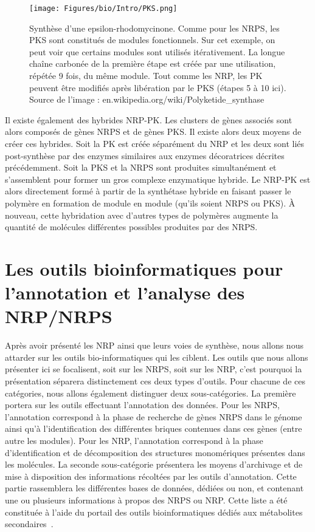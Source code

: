 \begin{figure}
  \begin{center}
    \texttt{[image: Figures/bio/Intro/PKS.png]}
    \caption{\label{pks}Synthèse d'une epsilon-rhodomycinone.
    Comme pour les NRPS, les PKS sont constitués de modules fonctionnels.
    Sur cet exemple, on peut voir que certains modules sont utilisés itérativement.
    La longue chaîne carbonée de la première étape est créée par une utilisation, répétée 9 fois, du même module.
    Tout comme les NRP, les PK peuvent être modifiés après libération par le PKS (étapes 5 à 10 ici).
    Source de l'image : en.wikipedia.org/wiki/Polyketide\_synthase}
  \end{center}
\end{figure}

Il existe également des hybrides NRP-PK.
Les clusters de gènes associés sont alors composés de gènes NRPS et de gènes PKS.
Il existe alors deux moyens de créer ces hybrides.
Soit la PK est créée séparément du NRP et les deux sont liés post-synthèse par des enzymes similaires aux enzymes décoratrices décrites précédemment.
Soit la PKS et la NRPS sont produites simultanément et s'assemblent pour former un gros complexe enzymatique hybride.
Le NRP-PK est alors directement formé à partir de la synthétase hybride en faisant passer le polymère en formation de module en module (qu'ils soient NRPS ou PKS).
À nouveau, cette hybridation avec d'autres types de polymères augmente la quantité de molécules différentes possibles produites par des NRPS.









\section{Les outils bioinformatiques pour l'annotation et l'analyse des NRP/NRPS}
\label{bioanalyse}

Après avoir présenté les NRP ainsi que leurs voies de synthèse, nous allons nous attarder sur les outils bio-informatiques qui les ciblent.
Les outils que nous allons présenter ici se focalisent, soit sur les NRPS, soit sur les NRP, c'est pourquoi la présentation séparera distinctement ces deux types d'outils.
Pour chacune de ces catégories, nous allons également distinguer deux sous-catégories.
La première portera sur les outils effectuant l'annotation des données.
Pour les NRPS, l'annotation correspond à la phase de recherche de gènes NRPS dans le génome ainsi qu'à l'identification des différentes briques contenues dans ces gènes (entre autre les modules).
Pour les NRP, l'annotation correspond à la phase d'identification et de décomposition des structures monomériques présentes dans les molécules.
La seconde sous-catégorie présentera les moyens d'archivage et de mise à disposition des informations récoltées par les outils d'annotation.
Cette partie rassemblera les différentes bases de données, dédiées ou non, et contenant une ou plusieurs informations à propos des NRPS ou NRP.
Cette liste a été constituée à l'aide du portail des outils bioinformatiques dédiés aux métabolites secondaires~\cite{weber_secondary_2016}.

